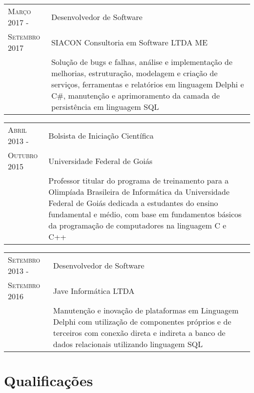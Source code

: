 \documentclass[12pt, oneside, openany, a4paper, english, brazil]{abntex2}
\begin{document}
\begin{tabular}{p{3.5cm}p{11cm}}
    \textsc{Março 2017} - & Desenvolvedor de Software \\
    \textsc{Setembro 2017} & SIACON Consultoria em Software LTDA ME \\ 
    \textsc{} & Solução de bugs e falhas, análise e implementação de melhorias, estruturação, modelagem e criação de serviços, ferramentas e relatórios em linguagem Delphi e C\#, manutenção e aprimoramento da camada de persistência em linguagem SQL
\end{tabular}                                    

\begin{tabular}{p{3.5cm}p{11cm}}
    \textsc{Abril 2013} - &  Bolsista de Iniciação Científica \\
    \textsc{Outubro 2015} & Universidade Federal de Goiás \\
    \textsc{} & Professor titular do programa de treinamento para a Olimpíada Brasileira de Informática da Universidade Federal de Goiás dedicada a estudantes do ensino fundamental e médio, com base em fundamentos básicos da programação de computadores na linguagem C e C++
\end{tabular}

\begin{tabular}{p{3.5cm}p{11cm}}
    \textsc{Setembro 2013} - & Desenvolvedor de Software \\
    \textsc{Setembro 2016} & Jave Informática LTDA \\ 
    \textsc{} & Manutenção e inovação de plataformas em Linguagem Delphi com utilização de componentes próprios e de terceiros com conexão direta e indireta a banco de dados relacionais utilizando linguagem SQL
\end{tabular}


\section{Qualificações}
\end{document}
